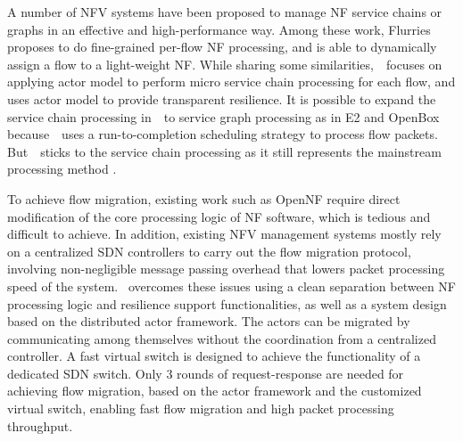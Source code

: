 A number of NFV systems \cite{palkar2015e2, OpenBox, sekar2012design, anderson2012xomb, hwang2015netvm, zhang2016opennetvm, martins2014clickos, zhang2016flurries} have been proposed to manage NF service chains or graphs in an effective and high-performance way. Among these work, Flurries \cite{zhang2016flurries} proposes to do fine-grained per-flow NF processing, and is able to dynamically assign a flow to a light-weight NF. While sharing some similarities,~\nfactor~focuses on applying actor model to perform micro service chain processing for each flow, and uses actor model to provide transparent resilience. It is possible to expand the service chain processing in~\nfactor~to service graph processing as in E2 \cite{palkar2015e2} and OpenBox \cite{OpenBox} because~\nfactor~uses a run-to-completion scheduling strategy to process flow packets. But~\nfactor~sticks to the service chain processing as it still represents the mainstream processing method \cite{hwang2015netvm, martins2014clickos}.


To achieve flow migration, existing work such as OpenNF \cite{gember2015opennf} require direct modification of the core processing logic of NF software, which is tedious and difficult to achieve. In addition, existing NFV management \cite{rajagopalan2013split} \cite{gember2015opennf} systems %
mostly rely on a centralized SDN controllers to carry out the flow migration protocol, involving non-negligible message passing overhead that lowers packet processing speed of the system.
\nfactor~overcomes these issues using a clean separation between NF processing logic and resilience support functionalities, as well as a system design based on the distributed actor framework. The actors can be migrated by communicating among themselves without the coordination from a centralized controller. A fast virtual switch is designed to achieve the functionality of a dedicated SDN switch. Only 3 rounds of request-response are needed for achieving flow migration, based on the actor framework and the customized virtual switch, enabling fast flow migration and high packet processing throughput.

